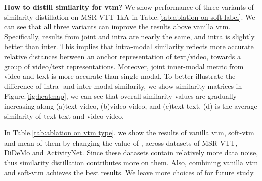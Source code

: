 \begin{table}[ht]
    \begin{center}
    \caption{Evaluation of the number of negative pairs . We report our experiment results on MSR-VTT 1kA and VATEX.}
    \label{tab:ablation on K}
    \end{center}
    \vspace{-6mm}
\end{table}

\noindent\textbf{How to distill similarity for vtm?} 
We show performance of three variants of similarity distillation on MSR-VTT 1kA in Table.\ref{tab:ablation on soft label}. 
We can see that all three variants can improve the results above vanilla vtm.
Specifically, results from joint and intra are nearly the same, and intra is slightly better than inter. This implies that intra-modal similarity reflects more accurate relative distances between an anchor representation of text/video, towards a group of video/text representations. Moreover, joint inner-modal metric from video and text is more accurate than single modal. To better illustrate the difference of intra- and inter-modal similarity, we show similarity matrices in Figure.\ref{fig:heatmap}, we can see that overall similarity values are gradually increasing along (a)text-video, (b)video-video, and (c)text-text. (d) is the average similarity of text-text and video-video. 

In Table.\ref{tab:ablation on vtm type}, we show the results of vanilla vtm, soft-vtm and mean of them by changing the value of , across datasets of MSR-VTT, DiDeMo and ActivityNet. Since these datasets contain relatively more data noise, thus similarity distillation contributes more on them. Also, combining vanilla vtm and soft-vtm achieves the best results. We leave more choices of  for future study.


